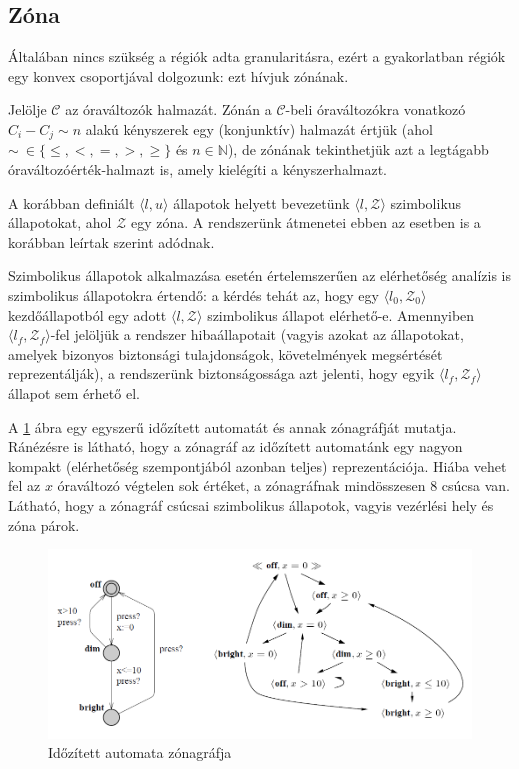 \subsection{Zóna} \label{zona}
Általában nincs szükség a régiók adta granularitásra, ezért a gyakorlatban régiók egy konvex csoportjával dolgozunk: ezt hívjuk zónának.

\begin{definition}[Zóna]
Jelölje $\mathcal{C}$ az óraváltozók halmazát. Zónán a $\mathcal{C}$-beli óraváltozókra vonatkozó $C_i - C_j \sim n$ alakú kényszerek egy (konjunktív) halmazát értjük (ahol $\sim\ \in \{\leq,<,=,>,\geq\}$ és $n \in \mathbb{N}$), de zónának tekinthetjük azt a legtágabb óraváltozóérték-halmazt is, amely kielégíti a kényszerhalmazt.
\end{definition}

A korábban definiált $\langle l, u \rangle$ állapotok helyett bevezetünk $\langle l, \mathcal{Z} \rangle$ szimbolikus állapotokat, ahol $\mathcal{Z}$ egy zóna. A rendszerünk átmenetei ebben az esetben is a korábban leírtak szerint adódnak.

Szimbolikus állapotok alkalmazása esetén értelemszerűen az elérhetőség analízis is szimbolikus állapotokra értendő: a kérdés tehát az, hogy egy $\langle l_0, \mathcal{Z}_0 \rangle$ kezdőállapotból egy adott $\langle l, \mathcal{Z} \rangle$ szimbolikus állapot elérhető-e. Amennyiben $\langle l_f, \mathcal{Z}_f \rangle$-fel jelöljük a rendszer hibaállapotait (vagyis azokat az állapotokat, amelyek bizonyos biztonsági tulajdonságok, követelmények megsértését reprezentálják), a rendszerünk biztonságossága azt jelenti, hogy egyik $\langle l_f, \mathcal{Z}_f \rangle$ állapot sem érhető el.

A \ref{fig:zonagraf-pelda} ábra egy egyszerű időzített automatát és annak zónagráfját mutatja. Ránézésre is látható, hogy a zónagráf az időzített automatánk egy nagyon kompakt (elérhetőség szempontjából azonban teljes) reprezentációja. Hiába vehet fel az $x$ óraváltozó végtelen sok értéket, a zónagráfnak mindösszesen 8 csúcsa van. Látható, hogy a zónagráf csúcsai szimbolikus állapotok, vagyis vezérlési hely és zóna párok.

\begin{figure}
    \centering
    \includegraphics[width=\textwidth, keepaspectratio]{figures/zonagraf-pelda.png}
    \caption{Időzített automata zónagráfja \cite{TimedAutomata}}
    \label{fig:zonagraf-pelda}
\end{figure}


